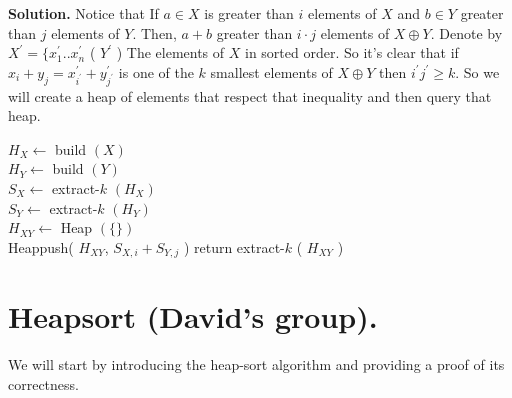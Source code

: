 \textbf{Solution.} Notice that If $a \in X$ is greater than $i$ elements of $X$ and $b \in Y$ greater than $j$ elements of $Y$. Then, $a + b$  greater than $i\cdot j$ elements of $X \oplus Y$. Denote by $X^\prime = \{ x^{\prime}_{1} .. x^{\prime}_{n}$ ( $Y^{\prime}$ ) The elements of $X$ in sorted order. So it's clear that if $x_{i}+y_{j} = x^{\prime}_{i^{\prime}} + y^{\prime}_{j^{\prime}}$ is one of the $k$ smallest elements of $X\oplus Y$ then $i^{\prime}j^{\prime} \ge k$. So we will create a heap of elements that respect that inequality and then query that heap.

\begin{algorithm}
$ H_{X} \leftarrow $ build $\left( X \right)$  \\ 
$ H_{Y} \leftarrow $ build $\left( Y \right)$  \\
$ S_{X} \leftarrow $ extract-$k$ $\left( H_{X} \right)$  \\ 
$ S_{Y} \leftarrow $ extract-$k$ $\left( H_{Y} \right)$  \\
$ H_{XY} \leftarrow $ Heap $(\{ \} )$ \\
 {
   {
  	Heappush( $H_{XY}$, $S_{X,i} + S_{Y, j}$ )    
  }
}
return extract-$k$ ( $H_{XY}$ ) 
\end{algorithm}


\section{Heapsort (David's group).}

We will start by introducing the heap-sort algorithm and providing a proof of its correctness.

